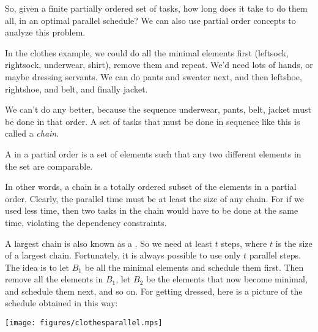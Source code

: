 So, given a finite partially ordered set of tasks, how long does it take
to do them all, in an optimal parallel schedule?  We can also use partial
order concepts to analyze this problem.

In the clothes example, we could do all the minimal elements first
(leftsock, rightsock, underwear, shirt), remove them and repeat.  We'd need
lots of hands, or maybe dressing servants.  We can do pants and sweater
next, and then leftshoe, rightshoe, and belt, and finally jacket.

We can't do any better, because the sequence underwear, pants, belt,
jacket must be done in that order.  A set of tasks that must be done in
sequence like this is called a \emph{chain}.

\begin{definition}
A  in a partial order is a set of elements such that any two
different elements in the set are comparable.
\end{definition}

In other words, a chain is a totally ordered subset of the elements in a
partial order.  Clearly, the parallel time must be at least the size of
any chain.  For if we used less time, then two tasks in the chain would
have to be done at the same time, violating the dependency constraints.

A largest chain is also known as a .  So we need at
least $t$ steps, where $t$ is the size of a largest chain.  Fortunately,
it is always possible to use only $t$ parallel steps.  The idea is to let
$B_1$ be all the minimal elements and schedule them first.  Then remove
all the elements in $B_1$, let $B_2$ be the elements that now become
minimal, and schedule them next, and so on.  For getting dressed, here is
a picture of the schedule obtained in this way:

\begin{center}\texttt{[image: figures/clothesparallel.mps]}\end{center}


